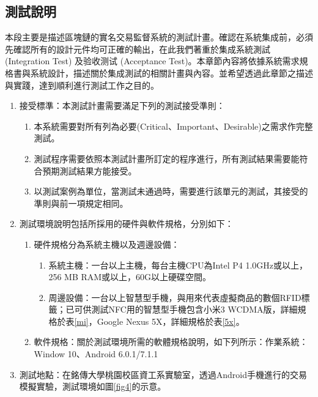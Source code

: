 	 	\subsection{測試說明}
	 	本段主要是描述區塊鏈的實名交易監督系統的測試計畫。確認在系統集成前，必須先確認所有的設計元件均可正確的輸出，在此我們著重於集成系統測試 (Integration Test) 及验收测试 (Acceptance Test)。本章節內容將依據系統需求規格書與系統設計，描述關於集成測試的相關計畫與內容。並希望透過此章節之描述與實踐，達到順利進行測試工作之目的。
	 		\begin{enumerate}
	 			
	 			\item 接受標準：本測試計畫需要滿足下列的測試接受準則： 

	 			\begin{enumerate}
					\item 本系統需要對所有列為必要(Critical、Important、Desirable)之需求作完整測試。
					\item 測試程序需要依照本測試計畫所訂定的程序進行，所有測試結果需要能符合預期測試結果方能接受。
					\item 以測試案例為單位，當測試未通過時，需要進行該單元的測試，其接受的準則與前一項規定相同。 
				\end{enumerate}

				\item 測試環境說明包括所採用的硬件與軟件規格，分別如下：
				\begin{enumerate}
					\item 硬件規格分為系統主機以及週邊設備：
					
					\begin{enumerate}
						\item 系統主機：一台以上主機，每台主機CPU為Intel P4 1.0GHz或以上，256 MB RAM或以上，60G以上硬碟空間。
						\item 周邊設備：一台以上智慧型手機，與用來代表虛擬商品的數個RFID標籤；已可供測試NFC用的智慧型手機包含小米3 WCDMA版，詳細規格於表\ref{mi}，Google Nexus 5X，詳細規格於表\ref{5x}。
					
					\end{enumerate}
					\item 軟件規格：關於測試環境所需的軟體規格說明，如下列所示：作業系統：Window 10、Android 6.0.1/7.1.1

				\end{enumerate}
				\item 測試地點：在銘傳大學桃園校區資工系實驗室，透過Android手機進行的交易模擬實驗，測試環境如圖\ref{fig4}的示意。


\end{enumerate}
